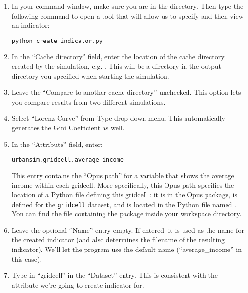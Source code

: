 \documentclass{howto}
\begin{document}
\begin{enumerate}

\item In your command window, make sure you are in the
 directory.  Then type the following command to
open a tool that will allow us to specify and then view an
indicator:

\begin{verbatim}
python create_indicator.py
\end{verbatim}

\item In the ``Cache directory'' field, enter the location of the cache directory
created by the
simulation, e.g. .
This will be a directory in the output directory you specified when
starting the simulation.

\item Leave the ``Compare to another cache directory'' unchecked.  This option lets you 
compare results from two different simulations.

\item Select ``Lorenz Curve'' from Type drop down menu. This automatically generates the
Gini Coefficient as well.

\item In the ``Attribute'' field, enter:

\begin{verbatim}
urbansim.gridcell.average_income
\end{verbatim}

This entry contains the ``Opus path'' for a variable that shows the
average income within each gridcell.  More specifically, this Opus path specifies
the location of a Python file defining this gridcell : it is
in the  Opus package, is defined for the
\verb|gridcell| dataset, and is located in the Python file named
. You can find the file containing the 
package inside your workspace directory.

\item Leave the optional ``Name'' entry empty. If entered, it is used
as the name for the created indicator (and also determines the filename of the
resulting indicator). We'll let the program use the default name
(``average_income'' in this case).

\item Type in ``gridcell'' in the ``Dataset'' entry.  This is consistent with the attribute 
we're going to create indicator for. 


\end{enumerate}
\end{document}
